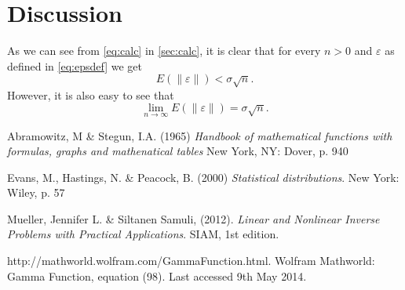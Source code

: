 \documentclass[12pt,a4]{article}
\newcommand{\lnorm}{\left\|}
\newcommand{\rnorm}{\right\|}
\newcommand{\eps}{\ensuremath{\varepsilon}}
\begin{document}
\section{Discussion}

As we can see from \cref{eq:calc} in \cref{sec:calc}, it is clear that for every $n > 0$ and $\eps$ as defined in \cref{eq:epsdef} we get
\begin{equation}
E \left( \lnorm \eps \rnorm \right) < \sigma \sqrt{n} .
\end{equation}
However, it is also easy to see that 
\begin{equation}
\lim_{n \rightarrow \infty} E \left( \lnorm \eps \rnorm \right) = \sigma \sqrt{n} .
\end{equation}


\begin{thebibliography}{9}

\begin{footnotesize}
    
    Abramowitz, M \& Stegun, I.A. (1965)
    \emph{Handbook of mathematical functions with formulas, graphs and mathenatical tables}
    New York, NY: Dover, p. 940
    
    Evans, M., Hastings, N. \& Peacock, B. (2000)
    \emph{Statistical distributions}.
    New York: Wiley, p. 57
    
	Mueller, Jennifer L. \& Siltanen Samuli, (2012).
	\emph{Linear and Nonlinear Inverse Problems with Practical Applications}.
	SIAM, 1st edition.

    http://mathworld.wolfram.com/GammaFunction.html. Wolfram Mathworld: Gamma Function, equation (98). Last accessed 9th May 2014.


\end{footnotesize}

\end{thebibliography}
\end{document}
